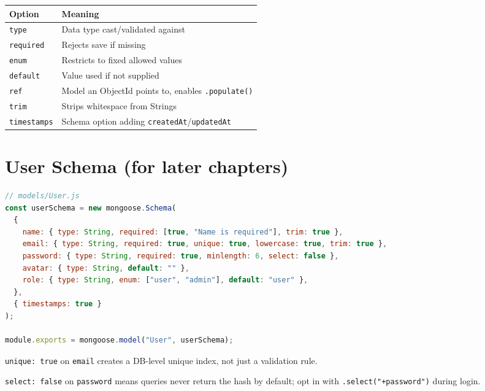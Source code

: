 \begin{table}[h]
\centering
\begin{tabularx}{\textwidth}{l X}
\toprule
\textbf{Option} & \textbf{Meaning} \\
\midrule
\texttt{type}      & Data type cast/validated against \\
\texttt{required}   & Rejects save if missing \\
\texttt{enum}       & Restricts to fixed allowed values \\
\texttt{default}    & Value used if not supplied \\
\texttt{ref}        & Model an ObjectId points to, enables \texttt{.populate()} \\
\texttt{trim}       & Strips whitespace from Strings \\
\texttt{timestamps} & Schema option adding \texttt{createdAt}/\texttt{updatedAt} \\
\bottomrule
\end{tabularx}
\end{table}

\section{User Schema (for later chapters)}

\begin{lstlisting}[language=JavaScript]
// models/User.js
const userSchema = new mongoose.Schema(
  {
    name: { type: String, required: [true, "Name is required"], trim: true },
    email: { type: String, required: true, unique: true, lowercase: true, trim: true },
    password: { type: String, required: true, minlength: 6, select: false },
    avatar: { type: String, default: "" },
    role: { type: String, enum: ["user", "admin"], default: "user" },
  },
  { timestamps: true }
);

module.exports = mongoose.model("User", userSchema);
\end{lstlisting}

\begin{notebox}[NOTE]
\texttt{unique: true} on \texttt{email} creates a DB-level unique index, not just a validation rule.
\end{notebox}

\begin{tipbox}[TIP]
\texttt{select: false} on \texttt{password} means queries never return the hash by default; opt in with \texttt{.select("+password")} during login.
\end{tipbox}

